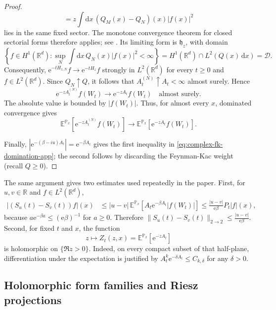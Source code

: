 \documentclass[11pt,reqno]{amsart}
\theoremstyle{definition}
\numberwithin{equation}{section}
\newcommand{\<}{\langle}
\renewcommand{\>}{\rangle}
\def\R{{\mathbb R}}
\def\de{{\rm d}}
\def\prob{{\mathbb P}}
\def\de{{\mathrm {d}}}
\begin{document}
\begin{appendix}
\begin{proof}
\[ =z\int \de x \, (Q_M(x)-Q_N)(x)|f(x)|^2
\]
lies in the same fixed sector.  The monotone convergence theorem for closed
sectorial forms therefore applies; see
\cite{VogtVoigt}.  Its limiting form is
$\mathfrak h_z$, with domain
\[
 \left\{f\in H^1(\mathbb R^d):
       \sup_N\int \de x \, Q_N (x)|f(x)|^2<\infty\right\}
 =H^1(\mathbb R^d)\cap L^2(Q(x)\,\de x)=\mathcal D.
\]
Consequently, $\mathrm e^{-tH_{z,N}}f\longrightarrow \mathrm e^{-tH_z}f$ strongly in $L^2(\R^d)$
for every $t\geq0$ and $f\in L^2(\mathbb R^d)$.
Since $Q_N\uparrow Q$, it follows that $A_t^{(N)}\uparrow A_t<\infty$ almost surely.
Hence
\[
      \mathrm   e^{-zA_t^{(N)}}f(W_t)
       \longrightarrow \mathrm  e^{-zA_t}f(W_t)
       \quad\text{almost surely}.
\]
The absolute value is bounded by $|f(W_t)|$.  Thus, for almost every $x$,
dominated convergence gives
\[
 \mathbb E^{\prob_x}[\mathrm e^{-zA_t^{(N)}}f(W_t)]
 \longrightarrow
 \mathbb E^{\prob_x}[\mathrm e^{-zA_t}f(W_t)].
\]

Finally, $|\mathrm e^{-(\beta-iu)A_t}|= \mathrm  e^{-\beta A_t}$
gives the first inequality in
\eqref{eq:complex-fk-domination-app}; the second follows by discarding the
Feynman-Kac weight (recall $Q \ge 0$).
\end{proof}

The same argument gives two estimates used repeatedly in the paper.  First,
for $u,v\in\mathbb R$ and $f\in L^2(\mathbb R^d)$,
\begin{align}
    \nonumber
 |(S_u(t)-S_v(t))f|(x)
 &\leq |u-v|\,
 \mathbb E^{\prob_x}[A_t \mathrm e^{-\beta A_t}|f(W_t)|] 
 \leq \frac{|u-v|}{\mathrm e\beta}P_t|f|(x),
 \nonumber
\end{align}
because $a\mathrm e^{-\beta a}\leq(\mathrm e\beta)^{-1}$ for $a\geq0$.  Therefore $\|S_u(t)-S_v(t)\|_{2\to2}
  \leq\frac{|u-v|}{\mathrm e\beta}.$
Second, for fixed $t$ and $x$, the function
\[
      z\longmapsto Z_t(z,x)=\mathbb E^{\prob_x}[\mathrm e^{-zA_t}]
\]
is holomorphic on $\{\Re z>0\}$.  Indeed, on every compact
subset of that half-plane, differentiation under the expectation is justified
by $A_t^k \mathrm e^{-\delta A_t}\leq C_{k,\delta}$ for any $\delta >0$.

\subsection{Holomorphic form families and Riesz projections}
\label{subsec:holomorphic-riesz-app}


\end{appendix}
\end{document}

